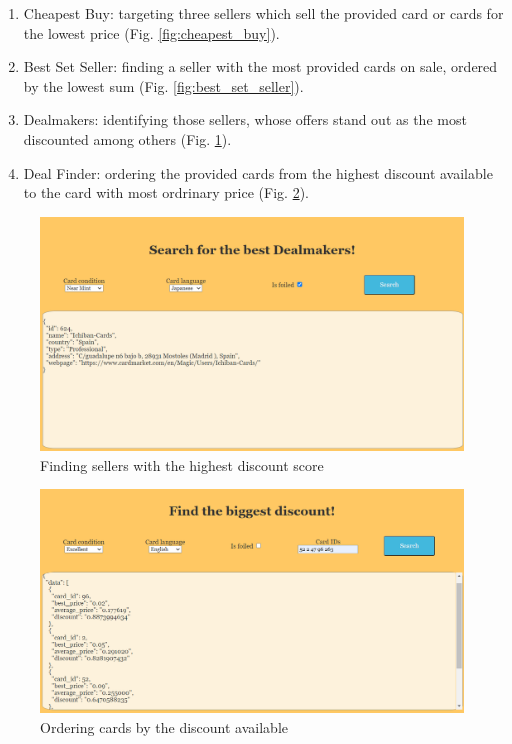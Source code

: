 \begin{enumerate}
    \item Cheapest Buy: targeting three sellers which sell the provided card or cards for the lowest price (Fig. \ref{fig:cheapest_buy}).
    \item Best Set Seller: finding a seller with the most provided cards on sale, ordered by the lowest sum (Fig. \ref{fig:best_set_seller}).
    \item Dealmakers: identifying those sellers, whose offers stand out as the most discounted among others (Fig. \ref{fig:dealmakers}).
    \item Deal Finder: ordering the provided cards from the highest discount available to the card with most ordrinary price (Fig. \ref{fig:deal_finder}).
\end{enumerate}

\begin{figure}
    \centering
    \includegraphics[width=\textwidth]{figures/dealmakers.png}
    \caption{Finding sellers with the highest discount score}
    \label{fig:dealmakers}
\end{figure}

\begin{figure}
    \centering
    \includegraphics[width=\textwidth]{figures/deal_finder.png}
    \caption{Ordering cards by the discount available}
    \label{fig:deal_finder}
\end{figure}

